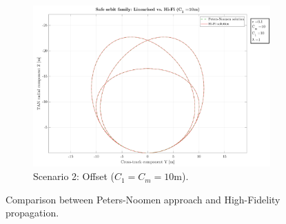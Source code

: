 		\begin{figure}
		\centering
		\ContinuedFloat
		\begin{subfigure}[t]{.7\linewidth}
		\centering\includegraphics[width=\linewidth]{Chapters/Chapter_03/Safe_orbit_comp_C1_10}
		\caption{Scenario 2: Offset ($C_1 = C_m = 10$m).}
		\label{figCh3:PN_vs_HiFi_2}
		\end{subfigure}
		\caption{Comparison between Peters-Noomen approach and High-Fidelity propagation.}
		\label{figCh3:PN_vs_HiFi}
		\end{figure}
		\FloatBarrier
